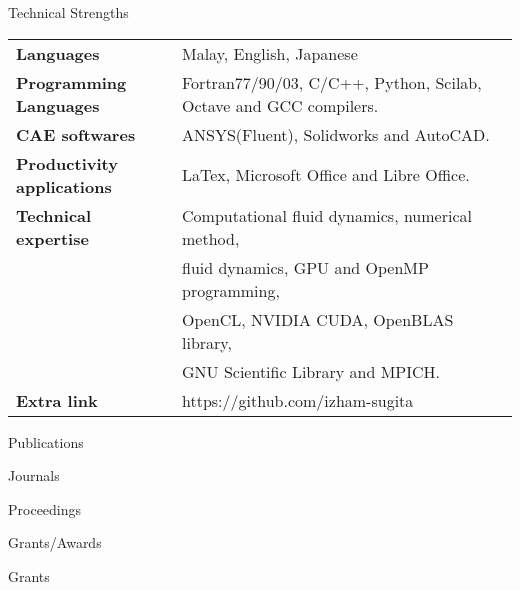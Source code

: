 \documentclass{resume} %
\begin{document}
\begin{rSection}{Technical Strengths}

\begin{tabular}{ @{} >{\bfseries}l @{\hspace{6ex}} l }
Languages & Malay, English, Japanese \\
Programming Languages & Fortran77/90/03, C/C++, Python, Scilab, Octave and GCC compilers. \\
CAE softwares & ANSYS(Fluent), Solidworks and AutoCAD. \\
Productivity applications & LaTex, Microsoft Office and Libre Office.\\
Technical expertise & Computational fluid dynamics, numerical method,\\ 
                    & fluid dynamics, GPU and OpenMP programming, \\
& OpenCL, NVIDIA CUDA, OpenBLAS library, \\
& GNU Scientific Library and  MPICH. \\
Extra link  & https://github.com/izham-sugita
\end{tabular}

\end{rSection}


\begin{rSection}{Publications}
\begin{rSubsectionPub}{Journals}{}{}{}



\end{rSubsectionPub}

\begin{rSubsectionPub}{Proceedings}{}{}{}



\end{rSubsectionPub}

\end{rSection}


\begin{rSection}{Grants/Awards}
\begin{rSubsectionPub}{Grants}{}{}{}



\end{rSubsectionPub}
\end{rSection}
\end{document}
